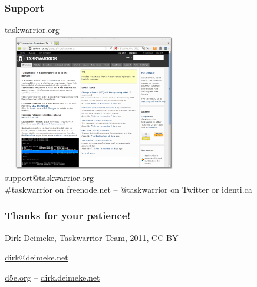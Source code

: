 \documentclass[t,handout]{beamer}
\begin{document}
\begin{frame}
\frametitle{Support}
\begin{center}
\href{http://taskwarrior.org/}{taskwarrior.org \\ \includegraphics[width=8cm,height=6cm]{website.png}} \\
\href{mailto:support@taskwarrior.org}{support@taskwarrior.org} \\
\#taskwarrior on freenode.net -- @taskwarrior on Twitter or identi.ca
\end{center}
\end{frame}

\begin{frame}
\frametitle{Thanks for your patience!}
\begin{center}
Dirk Deimeke, Taskwarrior-Team, 2011, \href{https://creativecommons.org/licenses/by/3.0/}{CC-BY}

\href{mailto:dirk@deimeke.net}{dirk@deimeke.net}

\href{http://d5e.org/}{d5e.org} -- \href{http://dirk.deimeke.net/}{dirk.deimeke.net}
\end{center}
\end{frame}
\end{document}
